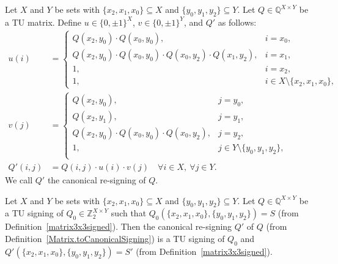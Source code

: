 \begin{definition}
    \label{Matrix.toCanonicalSigning}
    \leanok
    Let $X$ and $Y$ be sets with $\{x_{2}, x_{1}, x_{0}\} \subseteq X$ and $\{y_{0}, y_{1}, y_{2}\} \subseteq Y$. Let $Q \in \mathbb{Q}^{X \times Y}$ be a TU matrix. Define $u \in \{0, \pm 1\}^{X}$, $v \in \{0, \pm 1\}^{Y}$, and $Q'$ as follows:
    \begin{align*}
        u(i) &= \begin{cases}
            Q (x_{2}, y_{0}) \cdot Q (x_{0}, y_{0}), & i = x_{0}, \\
            Q (x_{2}, y_{0}) \cdot Q (x_{0}, y_{0}) \cdot Q (x_{0}, y_{2}) \cdot Q (x_{1}, y_{2}), & i = x_{1}, \\
            1, & i = x_{2}, \\
            1, & i \in X \setminus \{x_{2}, x_{1}, x_{0}\},
        \end{cases} \\
        v(j) &= \begin{cases}
            Q (x_{2}, y_{0}), & j = y_{0}, \\
            Q (x_{2}, y_{1}), & j = y_{1}, \\
            Q (x_{2}, y_{0}) \cdot Q (x_{0}, y_{0}) \cdot Q (x_{0}, y_{2}), & j = y_{2}, \\
            1, & j \in Y \setminus \{y_{0}, y_{1}, y_{2}\}, \\
        \end{cases} \\
        Q' (i, j) &= Q (i, j) \cdot u(i) \cdot v(j) \quad \forall i \in X, \ \forall j \in Y.
    \end{align*}
    We call $Q'$ the canonical re-signing of $Q$.
\end{definition}

\begin{lemma}
    \label{Matrix.HasTuCanonicalSigning.toCanonicalSigning}
    \leanok
    Let $X$ and $Y$ be sets with $\{x_{2}, x_{1}, x_{0}\} \subseteq X$ and $\{y_{0}, y_{1}, y_{2}\} \subseteq Y$. Let $Q \in \mathbb{Q}^{X \times Y}$ be a TU signing of $Q_{0} \in \mathbb{Z}_{2}^{X \times Y}$ such that $Q_{0} (\{x_{2}, x_{1}, x_{0}\}, \{y_{0}, y_{1}, y_{2}\}) = S$ (from Definition~\ref{matrix3x3signed}). Then the canonical re-signing $Q'$ of $Q$ (from Definition~\ref{Matrix.toCanonicalSigning}) is a TU signing of $Q_{0}$ and $Q' (\{x_{2}, x_{1}, x_{0}\}, \{y_{0}, y_{1}, y_{2}\}) = S'$ (from Definition~\ref{matrix3x3signed}).
\end{lemma}

